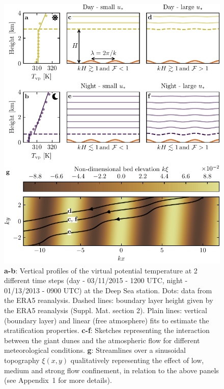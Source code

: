 \begin{figure}
\centering
\includegraphics[scale=1]{Figures/Figure4.pdf}
\caption{\textbf{a-b}: Vertical profiles of the virtual potential temperature at 2 different time steps (day - 03/11/2015 - 1200 UTC, night - 01/13/2013 - 0900 UTC) at the Deep Sea station. Dots: data from the ERA5 reanalysis. Dashed lines: boundary layer height given by the ERA5 reanalysis (Suppl. Mat. section 2). Plain lines: vertical (boundary layer) and linear (free atmosphere) fits to estimate the stratification properties. \textbf{c-f}: Sketches representing the interaction between the giant dunes and the atmospheric flow for different meteorological conditions. \textbf{g}: Streamlines over a sinusoidal topography $\xi(x,y)$ qualitatively representing the effect of low, medium and strong flow confinement, in relation to the above panels (see Appendix~1 for more details). }
\label{Fig4}
\end{figure}


